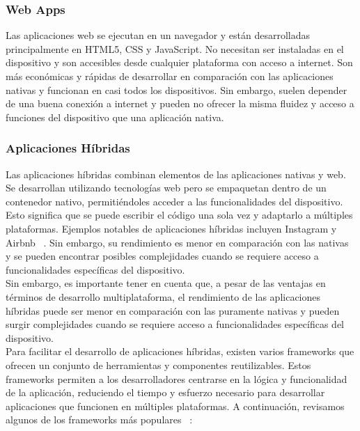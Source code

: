 \subsubsection{Web Apps}
Las aplicaciones web se ejecutan en un navegador y están desarrolladas principalmente en HTML5, CSS y JavaScript. No necesitan ser instaladas en el dispositivo y son accesibles desde cualquier plataforma con acceso a internet. Son más económicas y rápidas de desarrollar en comparación con las aplicaciones nativas y funcionan en casi todos los dispositivos. Sin embargo, suelen depender de una buena conexión a internet y pueden no ofrecer la misma fluidez y acceso a funciones del dispositivo que una aplicación nativa.
\subsubsection{Aplicaciones Híbridas}
Las aplicaciones híbridas combinan elementos de las aplicaciones nativas y web. Se desarrollan utilizando tecnologías web pero se empaquetan dentro de un contenedor nativo, permitiéndoles acceder a las funcionalidades del dispositivo. Esto significa que se puede escribir el código una sola vez y adaptarlo a múltiples plataformas. Ejemplos notables de aplicaciones híbridas incluyen Instagram y Airbnb ~\cite{airbnb}. Sin embargo, su rendimiento es menor en comparación con las nativas y se pueden encontrar posibles complejidades cuando se requiere acceso a funcionalidades específicas del dispositivo.\\[1ex]
Sin embargo, es importante tener en cuenta que, a pesar de las ventajas en términos de desarrollo multiplataforma, el rendimiento de las aplicaciones híbridas puede ser menor en comparación con las puramente nativas y pueden surgir complejidades cuando se requiere acceso a funcionalidades específicas del dispositivo.\\[1ex]
Para facilitar el desarrollo de aplicaciones híbridas, existen varios frameworks que ofrecen un conjunto de herramientas y componentes reutilizables. Estos frameworks permiten a los desarrolladores centrarse en la lógica y funcionalidad de la aplicación, reduciendo el tiempo y esfuerzo necesario para desarrollar aplicaciones que funcionen en múltiples plataformas. A continuación, revisamos algunos de los frameworks más populares ~\cite{ionic_vs_native_vs_fluter}:
